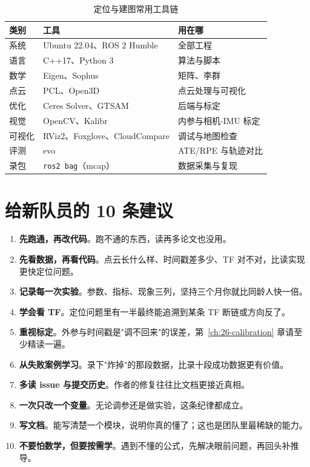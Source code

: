 \begin{table}[htbp]
  \centering
  \caption{定位与建图常用工具链}\label{tab:30-tools}
  \small
  \begin{tabular}{llp{6.4cm}}
    \toprule
    类别 & 工具 & 用在哪 \\
    \midrule
    系统 & Ubuntu 22.04、ROS 2 Humble & 全部工程 \\
    语言 & C++17、Python 3 & 算法与脚本 \\
    数学 & Eigen、Sophus & 矩阵、李群 \\
    点云 & PCL、Open3D & 点云处理与可视化 \\
    优化 & Ceres Solver、GTSAM & 后端与标定 \\
    视觉 & OpenCV、Kalibr & 内参与相机-IMU 标定 \\
    可视化 & RViz2、Foxglove、CloudCompare & 调试与地图检查 \\
    评测 & evo & ATE/RPE 与轨迹对比 \\
    录包 & \lstinline{ros2 bag}（mcap） & 数据采集与复现 \\
    \bottomrule
  \end{tabular}
\end{table}

\section{给新队员的 10 条建议}\label{sec:30-advice}

\begin{enumerate}
  \item \textbf{先跑通，再改代码}。跑不通的东西，读再多论文也没用。
  \item \textbf{先看数据，再看代码}。点云长什么样、时间戳差多少、TF 对不对，比读实现更快定位问题。
  \item \textbf{记录每一次实验}。参数、指标、现象三列，坚持三个月你就比同龄人快一倍。
  \item \textbf{学会看 TF}。定位问题里有一半最终能追溯到某条 TF 断链或方向反了。
  \item \textbf{重视标定}。外参与时间戳是"调不回来"的误差，第~\ref{ch:26-calibration} 章请至少精读一遍。
  \item \textbf{从失败案例学习}。录下"炸掉"的那段数据，比录十段成功数据更有价值。
  \item \textbf{多读 issue 与提交历史}。作者的修复往往比文档更接近真相。
  \item \textbf{一次只改一个变量}。无论调参还是做实验，这条纪律都成立。
  \item \textbf{写文档}。能写清楚一个模块，说明你真的懂了；这也是团队里最稀缺的能力。
  \item \textbf{不要怕数学，但要按需学}。遇到不懂的公式，先解决眼前问题，再回头补推导。
\end{enumerate}

